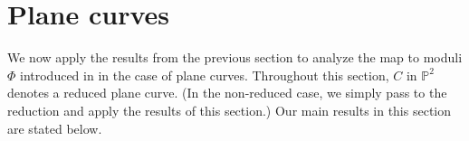 \documentclass[11pt,reqno]{amsart}
\theoremstyle{plain}
\theoremstyle{definition}
\theoremstyle{remark}
\numberwithin{equation}{section}
\numberwithin{equation}{section}
\newcommand{\PP}{\mathbb{P}}
\begin{document}

\section{Plane curves}
We now apply the results from the previous section to analyze the map to moduli $\Phi$ introduced in  in the case of plane curves. Throughout this section, $C$ in $\PP^2$ denotes a reduced plane curve. (In the non-reduced case, we simply pass to the reduction and apply the results of this section.) Our main results in this section are stated below.
\end{document}

